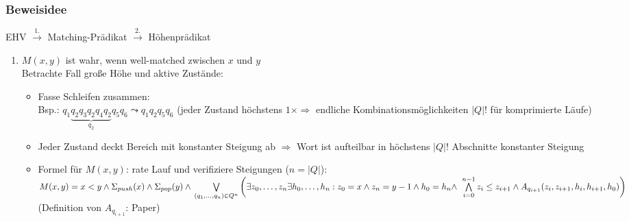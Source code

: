         \subsubsection{Beweisidee}
            EHV $\overset{1.}{\rightarrow}$ Matching-Prädikat $\overset{2.}{\rightarrow}$ Höhenprädikat
            \begin{enumerate}
                \item $M(x,y)$ ist wahr, wenn well-matched zwischen $x$ und $y$\\
                    Betrachte Fall große Höhe und aktive Zustände:\\
                    \begin{itemize}
                        \item Fasse Schleifen zusammen:\\
                            Bsp.: $q_1\underbrace{q_2q_3q_2q_4q_2}_{q_2}q_5q_6\leadsto q_1q_2q_5q_6$
                            (jeder Zustand höchstens $1\times\Rightarrow$ endliche Kombinationsmöglichkeiten $|Q|!$ für komprimierte Läufe)
                        \item Jeder Zustand deckt Bereich mit konstanter Steigung ab $\Rightarrow$ Wort ist aufteilbar in höchstens $|Q|!$ Abschnitte konstanter Steigung
                        \item Formel für $M(x,y)$: rate Lauf und verifiziere Steigungen ($n=|Q|$):\\
                        $M(x,y)=x<y\wedge\Sigmapush(x)\wedge\Sigmapop(y)\wedge\\
                        \bigvee\limits_{(q_1,\dots,q_n)\in Q^n}
                        \left(\vphantom{\bigwedge\limits_{i=0}^{n-1}} %
                        \exists z_0,\dots,z_n\exists h_0,\dots,h_n: z_0=x\wedge z_n=y-1\wedge h_0=h_n\wedge\right.\\
                        \left.\bigwedge\limits_{i=0}^{n-1}z_i\le z_{i+1}\wedge A_{q_{i+1}}(z_i,z_{i+1},h_i,h_{i+1},h_0)\right)$ (Definition von $A_{q_{i+1}}$: Paper)
                    \end{itemize}

            \end{enumerate}
